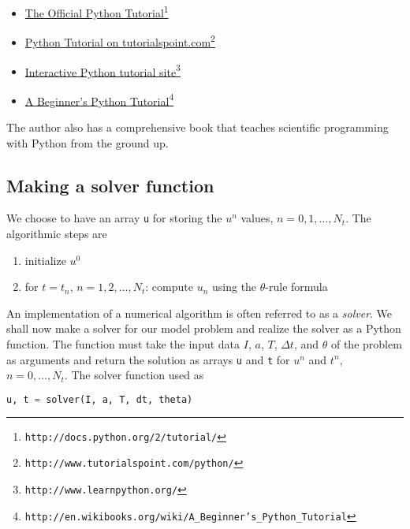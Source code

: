 \documentclass[graybox,sectrefs,envcountresetchap,open=right,final]{svmonodo}
\begin{document}
\begin{itemize}
  \item \href{{http://docs.python.org/2/tutorial/}}{The Official Python Tutorial}\footnote{\texttt{http://docs.python.org/2/tutorial/}}

  \item \href{{http://www.tutorialspoint.com/python/}}{Python Tutorial on tutorialspoint.com}\footnote{\texttt{http://www.tutorialspoint.com/python/}}

  \item \href{{http://www.learnpython.org/}}{Interactive Python tutorial site}\footnote{\texttt{http://www.learnpython.org/}}

  \item \href{{http://en.wikibooks.org/wiki/A_Beginner's_Python_Tutorial}}{A Beginner's Python Tutorial}\footnote{\texttt{http://en.wikibooks.org/wiki/A\_Beginner's\_Python\_Tutorial}}
\end{itemize}

\noindent
The author also has a comprehensive book \cite{Langtangen_2012} that teaches
scientific programming with Python from the ground up.


\subsection{Making a solver function}
\label{decay:py1}

We choose to have an array \texttt{u} for storing the $u^n$ values, $n=0,1,\ldots,N_t$.
The algorithmic steps are

\begin{enumerate}
 \item initialize $u^0$

 \item for $t=t_n$, $n=1,2,\ldots,N_t$: compute $u_n$ using the $\theta$-rule formula
\end{enumerate}

\noindent
An implementation of a numerical algorithm is often referred to as
a \emph{solver}. We shall now make a solver for our model problem and
realize the solver as a Python function. The function must take
the input data $I$, $a$, $T$, $\Delta t$, and $\theta$ of the problem
as arguments and return the solution as arrays \texttt{u} and \texttt{t} for
$u^n$ and $t^n$, $n=0,\ldots,N_t$. The solver function used as



\begin{lstlisting}[language=python,style=blue1_bluegreen]
u, t = solver(I, a, T, dt, theta)

\end{lstlisting}
\end{document}
